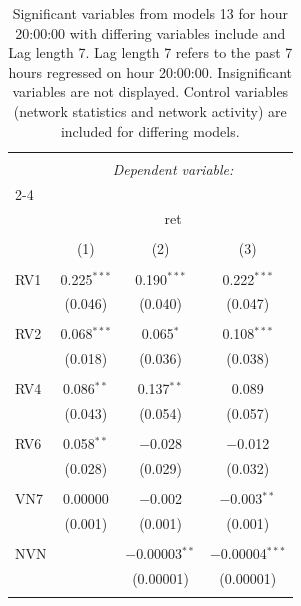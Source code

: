
\begin{table}[!htbp] \centering 
  \caption{Significant variables from models 13 for hour 20:00:00 with differing variables include 
                               and Lag length 7. Lag length 7 refers to the past 7 hours regressed on hour 20:00:00. 
                               Insignificant variables are not displayed. 
                               Control variables (network statistics and network activity) are 
                               included for differing models.} 
  \label{RVmodels2_t_hourlagged7} 
\scriptsize 
\begin{tabular}{@{\extracolsep{5pt}}lccc} 
\\[-1.8ex]\hline 
\hline \\[-1.8ex] 
 & \multicolumn{3}{c}{\textit{Dependent variable:}} \\ 
\cline{2-4} 
\\[-1.8ex] & \multicolumn{3}{c}{ret} \\ 
\\[-1.8ex] & (1) & (2) & (3)\\ 
\hline \\[-1.8ex] 
 RV1 & 0.225$^{***}$ & 0.190$^{***}$ & 0.222$^{***}$ \\ 
  & (0.046) & (0.040) & (0.047) \\ 
  & & & \\ 
 RV2 & 0.068$^{***}$ & 0.065$^{*}$ & 0.108$^{***}$ \\ 
  & (0.018) & (0.036) & (0.038) \\ 
  & & & \\ 
 RV4 & 0.086$^{**}$ & 0.137$^{**}$ & 0.089 \\ 
  & (0.043) & (0.054) & (0.057) \\ 
  & & & \\ 
 RV6 & 0.058$^{**}$ & $-$0.028 & $-$0.012 \\ 
  & (0.028) & (0.029) & (0.032) \\ 
  & & & \\ 
 VN7 & 0.00000 & $-$0.002 & $-$0.003$^{**}$ \\ 
  & (0.001) & (0.001) & (0.001) \\ 
  & & & \\ 
 NVN &  & $-$0.00003$^{**}$ & $-$0.00004$^{***}$ \\ 
  &  & (0.00001) & (0.00001) \\ 
  & & & \\ 

\end{tabular}
\end{table}
